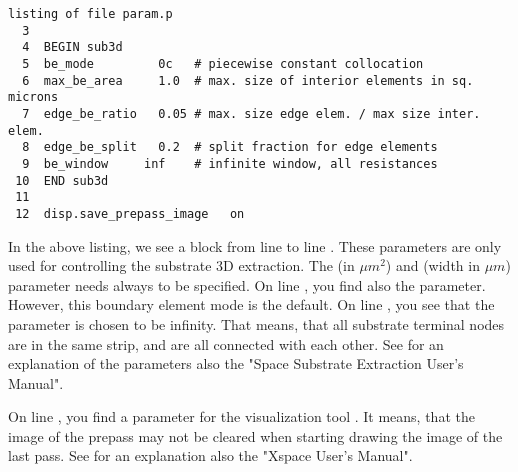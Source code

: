 \small \begin{Verbatim}[frame=single]
listing of file param.p
  3
  4  BEGIN sub3d
  5  be_mode         0c   # piecewise constant collocation
  6  max_be_area     1.0  # max. size of interior elements in sq. microns
  7  edge_be_ratio   0.05 # max. size edge elem. / max size inter. elem.
  8  edge_be_split   0.2  # split fraction for edge elements
  9  be_window     inf    # infinite window, all resistances
 10  END sub3d
 11
 12  disp.save_prepass_image   on
\end{Verbatim}
\normalsize
In the above listing, we see a  block from line  to line .
These parameters are only used for controlling the substrate 3D extraction.
The  (in $\mu m^2$) and  (width in $\mu m$) parameter
needs always to be specified.
On line , you find also the  parameter.
However, this boundary element mode is the default.
On line , you see that the  parameter is chosen to be infinity.
That means, that all substrate terminal nodes are in the same strip,
and are all connected with each other.
See for an explanation of the parameters also the "Space Substrate Extraction User's Manual".

On line , you find a parameter for the visualization tool .
It means, that the image of the prepass may not be cleared
when starting drawing the image of the last pass.
See for an explanation also the "Xspace User's Manual".

